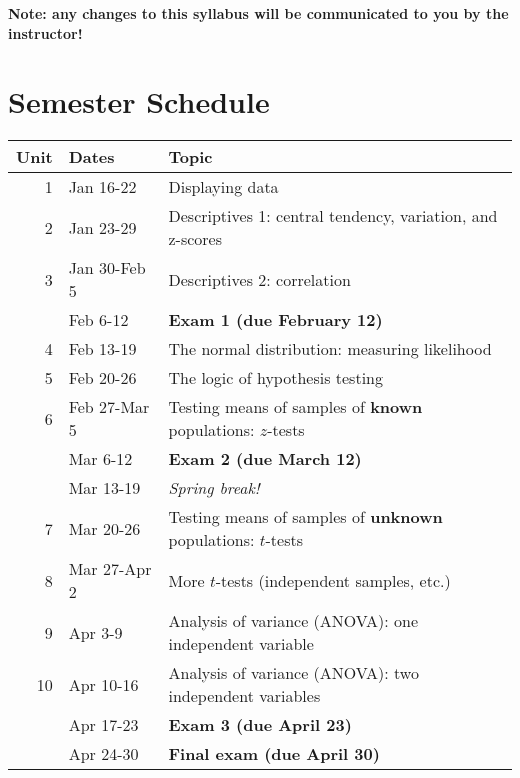 \documentclass[10pt]{article}
\begin{document}
\textbf{\textbf{Note:  any changes to this syllabus will be communicated to you by the instructor!}}

\section*{Semester Schedule}
\label{sec-11}
\begin{center}
\begin{tabular}{rll}
Unit & Dates & Topic\\
\hline
1 & Jan 16-22 & Displaying data\\
2 & Jan 23-29 & Descriptives 1: central tendency, variation, and z-scores\\
3 & Jan 30-Feb 5 & Descriptives 2: correlation\\
 & Feb 6-12 & \textbf{Exam 1 (due February 12)}\\
4 & Feb 13-19 & The normal distribution: measuring likelihood\\
5 & Feb 20-26 & The logic of hypothesis testing\\
6 & Feb 27-Mar 5 & Testing means of samples of \textbf{known} populations: $z$-tests\\
 & Mar 6-12 & \textbf{Exam 2 (due March 12)}\\
 & Mar 13-19 & \emph{Spring break!}\\
7 & Mar 20-26 & Testing means of samples of \textbf{unknown} populations: $t$-tests\\
8 & Mar 27-Apr 2 & More $t$-tests (independent samples, etc.)\\
9 & Apr 3-9 & Analysis of variance (ANOVA): one independent variable\\
10 & Apr 10-16 & Analysis of variance (ANOVA): two independent variables\\
 & Apr 17-23 & \textbf{Exam 3 (due April 23)}\\
 & Apr 24-30 & \textbf{Final exam (due April 30)}\\
\end{tabular}
\end{center}
\end{document}
